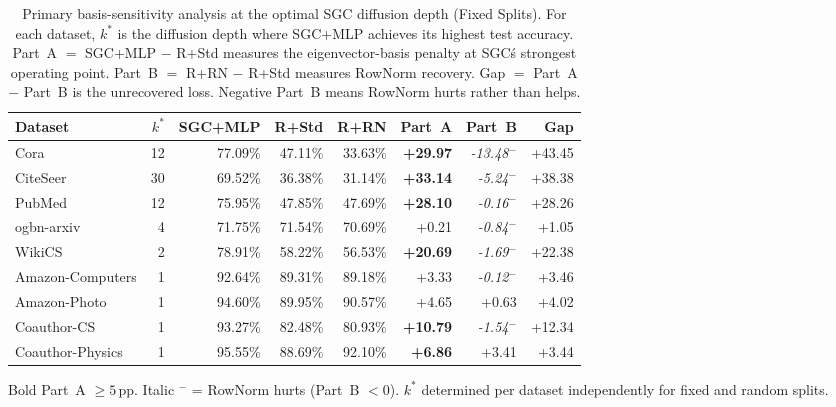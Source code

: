 \begin{table}[t]
\centering\small\setlength{\tabcolsep}{5pt}
\caption{Primary basis-sensitivity analysis at the optimal SGC diffusion depth (Fixed Splits). For each dataset, $k^*$ is the diffusion depth where SGC+MLP achieves its highest test accuracy. Part~A $=$ SGC+MLP $-$ R+Std measures the eigenvector-basis penalty at SGC\'s strongest operating point. Part~B $=$ R+RN $-$ R+Std measures RowNorm recovery. Gap $=$ Part~A $-$ Part~B is the unrecovered loss. Negative Part~B means RowNorm hurts rather than helps.}
\label{tab:primary_analysis_fixed}
\begin{tabular}{lrrrrrrr}
\toprule
Dataset & $k^*$ & SGC+MLP & R+Std & R+RN & Part~A & Part~B & Gap \\
\midrule
Cora                 &  12 & 77.09\% & 47.11\% & 33.63\% & \textbf{+29.97} & \textit{-13.48}$^-$ & +43.45 \\
CiteSeer             &  30 & 69.52\% & 36.38\% & 31.14\% & \textbf{+33.14} & \textit{-5.24}$^-$ & +38.38 \\
PubMed               &  12 & 75.95\% & 47.85\% & 47.69\% & \textbf{+28.10} & \textit{-0.16}$^-$ & +28.26 \\
ogbn-arxiv           &   4 & 71.75\% & 71.54\% & 70.69\% & +0.21 & \textit{-0.84}$^-$ & +1.05 \\
WikiCS               &   2 & 78.91\% & 58.22\% & 56.53\% & \textbf{+20.69} & \textit{-1.69}$^-$ & +22.38 \\
Amazon-Computers     &   1 & 92.64\% & 89.31\% & 89.18\% & +3.33 & \textit{-0.12}$^-$ & +3.46 \\
Amazon-Photo         &   1 & 94.60\% & 89.95\% & 90.57\% & +4.65 & +0.63 & +4.02 \\
Coauthor-CS          &   1 & 93.27\% & 82.48\% & 80.93\% & \textbf{+10.79} & \textit{-1.54}$^-$ & +12.34 \\
Coauthor-Physics     &   1 & 95.55\% & 88.69\% & 92.10\% & \textbf{+6.86} & +3.41 & +3.44 \\
\bottomrule
\end{tabular}
\begin{tablenotes}\small
\item Bold Part~A $\geq 5$\,pp. Italic $^-$ = RowNorm hurts (Part~B $< 0$). $k^*$ determined per dataset independently for fixed and random splits.
\end{tablenotes}
\end{table}
